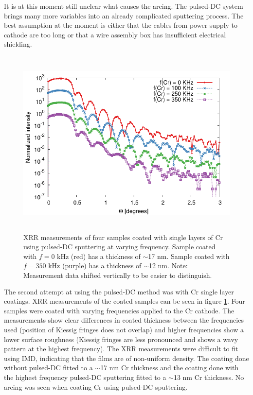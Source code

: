 It is at this moment still unclear what causes the arcing. The pulsed-DC system brings many more variables into an already complicated sputtering process. The best assumption at the moment is either that the cables from power supply to cathode are too long or that a wire assembly box has insufficient electrical shielding.

\begin{figure}[!h]
	\center
	\includegraphics[height=9.5cm]{figures/athena/coatings/cr_pulsed_2.pdf}
\caption{\footnotesize XRR measurements of four samples coated with single layers of Cr using pulsed-DC sputtering at varying frequency. Sample coated with $f=0$ kHz (red) has a thickness of $\sim$17 nm. Sample coated with $f=350$ kHz (purple) has a thickness of $\sim$12 nm. Note: Measurement data shifted vertically to be easier to distinguish.}\label{fig:cr-pulsed}
\end{figure}

The second attempt at using the pulsed-DC method was with Cr single layer coatings. XRR measurements of the coated samples can be seen in figure \ref{fig:cr-pulsed}. Four samples were coated with varying frequencies applied to the Cr cathode. The measurements show clear differences in coated thickness between the frequencies used (position of Kiessig fringes does not overlap) and higher frequencies show a lower surface roughness (Kiessig fringes are less pronounced and shows a wavy pattern at the highest frequency). The XRR measurements were difficult to fit using IMD, indicating that the films are of non-uniform density. The coating done without pulsed-DC fitted to a $\sim$17 nm Cr thickness and the coating done with the highest frequency pulsed-DC sputtering fitted to a $\sim$13 nm Cr thickness. No arcing was seen when coating Cr using pulsed-DC sputtering.

